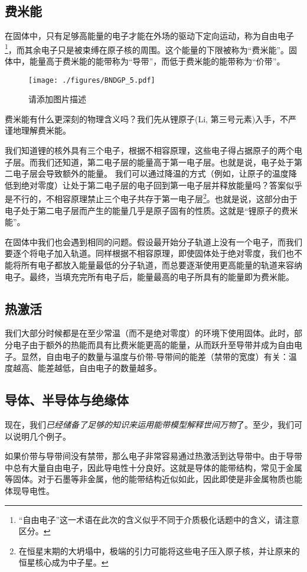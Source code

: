 \subsection{费米能}
在固体中，只有足够高能量的电子才能在外场的驱动下定向运动，称为自由电子\footnote{“自由电子”这一术语在此次的含义似乎不同于介质极化话题中的含义，请注意区分。}，而其余电子只是被束缚在原子核的周围。这个能量的下限被称为“费米能”。固体中，能量高于费米能的能带称为“导带”，而低于费米能的能带称为“价带”。
\begin{figure}[ht]
\centering
\texttt{[image: ./figures/BNDGP\_5.pdf]}
\caption{请添加图片描述} \label{BNDGP_fig5}
\end{figure}
费米能有什么更深刻的物理含义吗？我们先从锂原子(Li, 第三号元素)入手，不严谨地理解费米能。

我们知道锂的核外具有三个电子，根据不相容原理，这些电子得占据原子的两个电子层。而我们还知道，第二电子层的能量高于第一电子层。也就是说，电子处于第二电子层会导致额外的能量。
我们可以通过降温的方式（例如，让原子的温度降低到绝对零度）让处于第二电子层的电子回到第一电子层并释放能量吗？答案似乎是不行的，不相容原理禁止三个电子共存于第一电子层\footnote{在恒星末期的大坍塌中，极端的引力可能将这些电子压入原子核，并让原来的恒星核心成为中子星。}。也就是说，这部分由于电子处于第二电子层而产生的能量几乎是原子固有的性质。这就是“锂原子的费米能”。

在固体中我们也会遇到相同的问题。假设最开始分子轨道上没有一个电子，而我们要逐个将电子加入轨道。同样根据不相容原理，即使固体处于绝对零度，我们也不能将所有电子都放入能量最低的分子轨道，而总要逐渐使用更高能量的轨道来容纳电子。最终，当填充完所有电子后，能量最高的电子所具有的能量即为费米能。

\subsection{热激活}
我们大部分时候都是在至少常温（而不是绝对零度）的环境下使用固体。此时，部分电子由于额外的热能而具有比费米能更高的能量，从而跃升至导带并成为自由电子。显然，自由电子的数量与温度与价带-导带间的能差（禁带的宽度）有关：温度越高、能差越低，自由电子的数量越多。

\subsection{导体、半导体与绝缘体}
现在，我们\textsl{已经储备了足够的知识来运用能带模型解释世间万物}了。至少，我们可以说明几个例子。

如果价带与导带间没有禁带，那么电子非常容易通过热激活到达导带中。由于导带中总有大量自由电子，因此导电性十分良好。这就是导体的能带结构，常见于金属等固体。对于石墨等非金属，他的能带结构近似如此，因此即使是非金属物质也能体现导电性。

